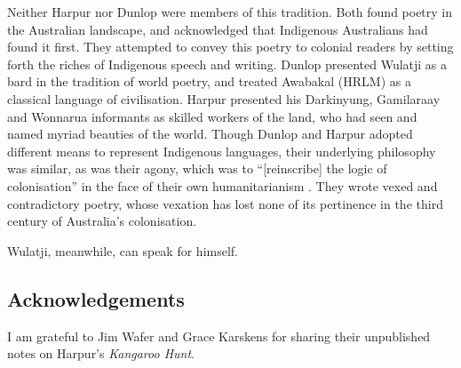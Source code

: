 \documentclass[
  Crown,
  times,
  sageh]{sagej}
\begin{document}
Neither Harpur nor Dunlop were members of this tradition. Both found
poetry in the Australian landscape, and acknowledged that Indigenous
Australians had found it first. They attempted to convey this poetry to
colonial readers by setting forth the riches of Indigenous speech and
writing. Dunlop presented Wulatji as a bard in the tradition of world
poetry, and treated Awabakal (HRLM) as a classical language of
civilisation. Harpur presented his Darkinyung, Gamilaraay and Wonnarua
informants as skilled workers of the land, who had seen and named myriad
beauties of the world. Though Dunlop and Harpur adopted different means
to represent Indigenous languages, their underlying philosophy was
similar, as was their agony, which was to ``{[}reinscribe{]} the logic
of colonisation'' in the face of their own humanitarianism
\citep[113]{minter_settlement_2021}. They wrote vexed and contradictory
poetry, whose vexation has lost none of its pertinence in the third
century of Australia's colonisation.

Wulatji, meanwhile, can speak for himself.

\subsection{Acknowledgements}\label{acknowledgements}

I am grateful to Jim Wafer and Grace Karskens for sharing their
unpublished notes on Harpur's \emph{Kangaroo Hunt}.


\end{document}
